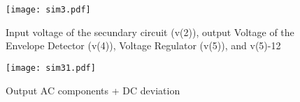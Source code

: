 \begin{figure}[h] \centering
\texttt{[image: sim3.pdf]}
\caption{Input voltage of the secundary circuit (v(2)), output Voltage of the Envelope Detector (v(4)), Voltage Regulator (v(5)), and v(5)-12}
\label{fig:sim5}
\end{figure}




\begin{figure}[h] \centering
\texttt{[image: sim31.pdf]}
\caption{Output AC components + DC deviation}
\label{fig:sim5}
\end{figure}


